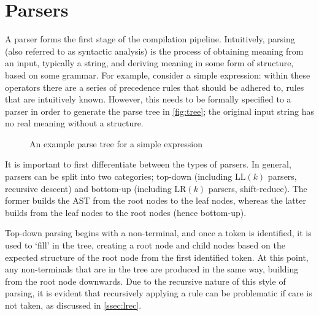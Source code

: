 \section{Parsers}
\label{sec:parsers}

A parser forms the first stage of the compilation pipeline.
Intuitively, parsing (also referred to as syntactic analysis) is the process of obtaining meaning from an input, typically a string, and deriving meaning in some form of structure, based on some grammar.
For example, consider a simple expression: within these operators there are a series of precedence rules that should be adhered to, rules that are intuitively known.
However, this needs to be formally specified to a parser in order to generate the parse tree in \autoref{fig:tree}; the original input string has no real meaning without a structure.
\begin{figure}[H]
\centering
{}
\caption{An example parse tree for a simple expression}
\label{fig:tree}
\end{figure}

It is important to first differentiate between the types of parsers.
In general, parsers can be split into two categories; top-down (including $\text{LL}(k)$ parsers, recursive descent) and bottom-up (including $\text{LR}(k)$ parsers, shift-reduce).
The former builds the AST from the root nodes to the leaf nodes, whereas the latter builds from the leaf nodes to the root nodes (hence bottom-up).

Top-down parsing begins with a non-terminal, and once a token is identified, it is used to `fill' in the tree, creating a root node and child nodes based on the expected structure of the root node from the first identified token.
At this point, any non-terminals that are in the tree are produced in the same way, building from the root node downwards.
Due to the recursive nature of this style of parsing, it is evident that recursively applying a rule can be problematic if care is not taken, as discussed in \autoref{ssec:lrec}.

